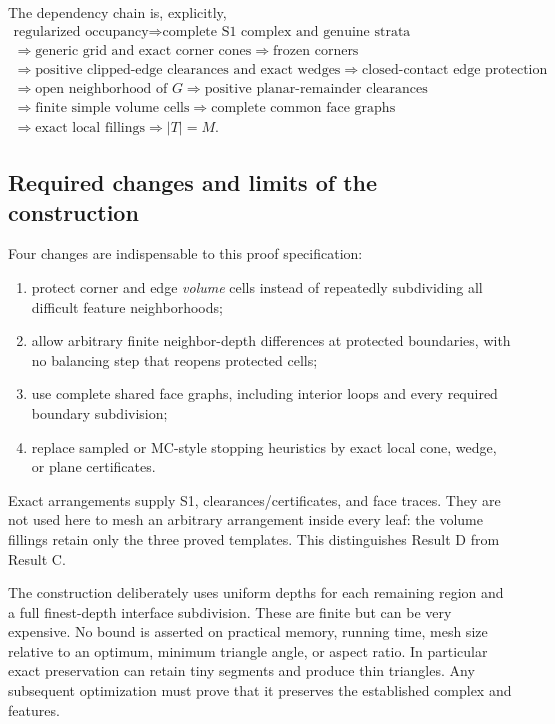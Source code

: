 \documentclass[11pt]{article}
\theoremstyle{definition}
\theoremstyle{remark}
\begin{document}
The dependency chain is, explicitly,
\[
\begin{gathered}
\text{regularized occupancy}
 \Longrightarrow \text{complete S1 complex and genuine strata}\\
\Longrightarrow \text{generic grid and exact corner cones}
 \Longrightarrow \text{frozen corners}\\
\Longrightarrow \text{positive clipped-edge clearances and exact wedges}
 \Longrightarrow \text{closed-contact edge protection}\\
\Longrightarrow \text{open neighborhood of }G
 \Longrightarrow \text{positive planar-remainder clearances}\\
\Longrightarrow \text{finite simple volume cells}
 \Longrightarrow \text{complete common face graphs}\\
\Longrightarrow \text{exact local fillings}
 \Longrightarrow |T|=M.
\end{gathered}
\]

\subsection{Required changes and limits of the construction}

Four changes are indispensable to this proof specification:
\begin{enumerate}
\item protect corner and edge \emph{volume} cells instead of repeatedly
  subdividing all difficult feature neighborhoods;
\item allow arbitrary finite neighbor-depth differences at protected
  boundaries, with no balancing step that reopens protected cells;
\item use complete shared face graphs, including interior loops and
  every required boundary subdivision;
\item replace sampled or MC-style stopping heuristics by exact local
  cone, wedge, or plane certificates.
\end{enumerate}
Exact arrangements supply S1, clearances/certificates, and face traces.
They are not used here to mesh an arbitrary arrangement inside every
leaf: the volume fillings retain only the three proved templates.
This distinguishes Result D from Result C.

The construction deliberately uses uniform depths for each remaining
region and a full finest-depth interface subdivision. These are finite
but can be very expensive. No bound is asserted on practical memory,
running time, mesh size relative to an optimum, minimum triangle angle,
or aspect ratio. In particular exact preservation can retain tiny
segments and produce thin triangles. Any subsequent optimization must
prove that it preserves the established complex and features.
\end{document}
